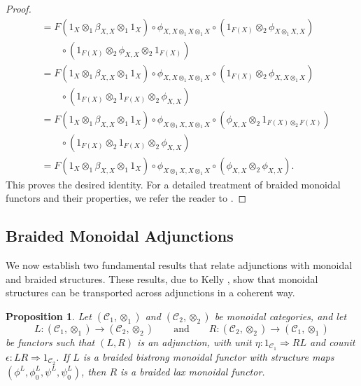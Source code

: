 \documentclass{amsart}
\newtheorem{proposition}{Proposition}[section]
\begin{document}
\begin{proof}
\begin{align*}
&= F(1_X \otimes_1 \beta_{X,X} \otimes_1 1_X) \circ \phi_{X, X\otimes_1 X\otimes_1 X} \circ (1_{F(X)} \otimes_2 \phi_{X\otimes_1 X, X}) \\
&\qquad \circ (1_{F(X)} \otimes_2 \phi_{X,X} \otimes_2 1_{F(X)}) \tag{naturality of $\phi$} \\
&= F(1_X \otimes_1 \beta_{X,X} \otimes_1 1_X) \circ \phi_{X, X\otimes_1 X\otimes_1 X} \circ (1_{F(X)} \otimes_2 \phi_{X, X\otimes_1 X}) \\
&\qquad \circ (1_{F(X)} \otimes_2 1_{F(X)} \otimes_2 \phi_{X,X}) \tag{naturality of $\phi$} \\
&= F(1_X \otimes_1 \beta_{X,X} \otimes_1 1_X) \circ \phi_{X\otimes_1 X, X\otimes_1 X} \circ (\phi_{X,X} \otimes_2 1_{F(X)\otimes_2 F(X)}) \\
&\qquad \circ (1_{F(X)} \otimes_2 1_{F(X)} \otimes_2 \phi_{X,X}) \tag{associativity coherence} \\
&= F(1_X \otimes_1 \beta_{X,X} \otimes_1 1_X) \circ \phi_{X\otimes_1 X, X\otimes_1 X} \circ (\phi_{X,X} \otimes_2 \phi_{X,X}).
\end{align*}
This proves the desired identity. For a detailed treatment of braided monoidal functors and their properties, we refer the reader to \cite{BT}.
\end{proof}

\subsection{Braided Monoidal Adjunctions}

We now establish two fundamental results that relate adjunctions with monoidal and braided structures. These results, due to Kelly \cite{DA}, show that monoidal structures can be transported across adjunctions in a coherent way.

\begin{proposition}\label{prop:braided_adjunction}
Let $(\mathcal{C}_1, \otimes_1)$ and $(\mathcal{C}_2, \otimes_2)$ be monoidal categories, and let
\[
L \colon (\mathcal{C}_1, \otimes_1) \longrightarrow (\mathcal{C}_2, \otimes_2)
\qquad\text{and}\qquad
R \colon (\mathcal{C}_2, \otimes_2) \longrightarrow (\mathcal{C}_1, \otimes_1)
\]
be functors such that $(L, R)$ is an adjunction, with unit $\eta \colon 1_{\mathcal{C}_1} \Rightarrow R L$ and counit $\epsilon \colon L R \Rightarrow 1_{\mathcal{C}_2}$. If $L$ is a braided bistrong monoidal functor with structure maps $(\phi^L, \phi_0^L, \psi^L, \psi_0^L)$, then $R$ is a braided lax monoidal functor.
\end{proposition}
\end{document}
